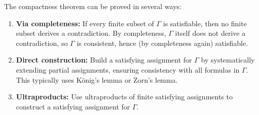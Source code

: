 \begin{remark}
The compactness theorem can be proved in several ways:

\begin{enumerate}
  \item \textbf{Via completeness:} If every finite subset of $\Gamma$ is
        satisfiable, then no finite subset derives a contradiction. By
        completeness, $\Gamma$ itself does not derive a contradiction, so
        $\Gamma$ is consistent, hence (by completeness again) satisfiable.

  \item \textbf{Direct construction:} Build a satisfying assignment for $\Gamma$
        by systematically extending partial assignments, ensuring consistency
        with all formulas in $\Gamma$. This typically uses König's lemma or
        Zorn's lemma.

  \item \textbf{Ultraproducts:} Use ultraproducts of finite satisfying
        assignments to construct a satisfying assignment for $\Gamma$.
\end{enumerate}
\end{remark}

